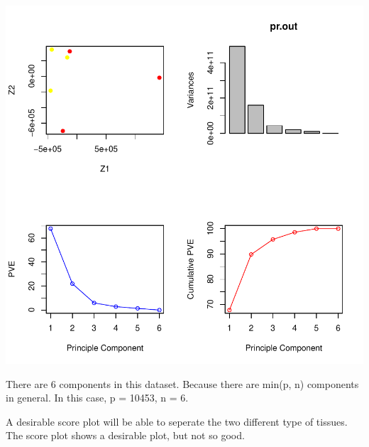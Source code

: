 \documentclass[a4paper]{article}
\begin{document}
\includegraphics{pca-1a}
\begin{enumerate}
{\color{red}
\item There are 6 components in this dataset. Because there are min(p, n) components in general. In this case, p = 10453, n = 6.
\item A desirable score plot will be able to seperate the two different type of tissues. The score plot shows a desirable plot, but not so good.
}
\end{enumerate}
\end{document}
